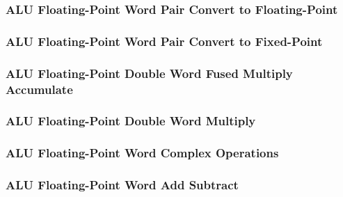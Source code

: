 \subsubsection[{\small ALU Floating-Point Word Pair Convert to Floating-Point}]{ALU Floating-Point Word Pair Convert to Floating-Point} \label{sec:format-ALU-FWPFLOAT}



\subsubsection[{\small ALU Floating-Point Word Pair Convert to Fixed-Point}]{ALU Floating-Point Word Pair Convert to Fixed-Point} \label{sec:format-ALU-FWPFIXED}



\subsubsection[{\small ALU Floating-Point Double Word Fused Multiply Accumulate}]{ALU Floating-Point Double Word Fused Multiply Accumulate} \label{sec:format-ALU-FDFMA}



\subsubsection[{\small ALU Floating-Point Double Word Multiply}]{ALU Floating-Point Double Word Multiply} \label{sec:format-ALU-FDMUL}



\subsubsection[{\small ALU Floating-Point Word Complex Operations}]{ALU Floating-Point Word Complex Operations} \label{sec:format-ALU-FWCOP}



\subsubsection[{\small ALU Floating-Point Word Add Subtract}]{ALU Floating-Point Word Add Subtract} \label{sec:format-ALU-FWADD}

